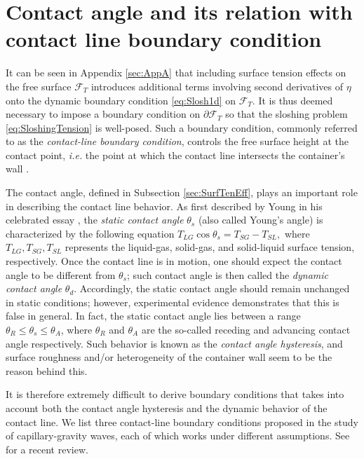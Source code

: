 \documentclass[letterpaper, 12pt]{amsart}
\newcommand{\F}{\mathcal{F}}
\begin{document}
\section{Contact angle and its relation with contact line boundary condition} \label{sec:ContactAngle}
It can be seen in Appendix \ref{sec:AppA} that including surface tension effects on the free surface $\F_T$ introduces additional terms involving second derivatives of $\eta$ onto the dynamic boundary condition \eqref{eq:Slosh1d} on $\F_T$. It is thus deemed necessary to impose a boundary condition on $\partial\F_T$ so that the sloshing problem \eqref{eq:SloshingTension} is well-posed. Such a boundary condition, commonly referred to as the \emph{contact-line boundary condition}, controls the free surface height at the contact point, {\it{i.e.}} the point at which the contact line intersects the container's wall \cite{Hocking:1987aa}. 

The contact angle, defined in Subsection \ref{sec:SurfTenEff}, plays an important role in describing the contact line behavior. As first described by Young in his celebrated essay \cite{Young:1805aa}, the \emph{static contact angle} $\theta_s$ (also called Young's angle) is characterized by the following equation
$ T_{LG}\cos\theta_s = T_{SG} - T_{SL}, $ 
where $T_{LG}, T_{SG}, T_{SL}$ represents the liquid-gas, solid-gas, and solid-liquid surface tension, respectively. Once the contact line is in motion, one should expect the contact angle to be different from $\theta_s$; such contact angle is then called the \emph{dynamic contact angle} $\theta_d$. Accordingly, the static contact angle should remain unchanged in static conditions; however, experimental evidence  \cite{Dussan:1979aa, Cocciaro:1991aa, Cocciaro:1993aa}  demonstrates that this is false in general. In fact, the static contact angle lies between a range $\theta_R\le \theta_s\le \theta_A$, where $\theta_R$ and $\theta_A$ are the so-called receding and advancing contact angle respectively. Such  behavior is known as the \emph{contact angle hysteresis}, and surface roughness and/or heterogeneity of the container wall seem to be the reason behind this.

It is therefore extremely difficult to derive boundary conditions that takes into account both the contact angle hysteresis and the dynamic behavior of the contact line. We list three contact-line boundary conditions proposed in the study of capillary-gravity waves, each of which works under different assumptions. See \cite{Pomeau:2002aa} for a recent review.
\end{document}

